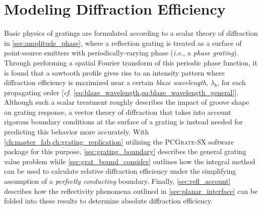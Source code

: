 \section{Modeling Diffraction Efficiency}\label{sec:integral_method}
Basic physics of gratings are formulated according to a scalar theory of diffraction in \cref{sec:amplitude_phase}, where a reflection grating is treated as a surface of point-source emitters with periodically-varying phase (\emph{i.e.}, a \emph{phase grating}). 
Through performing a spatial Fourier transform of this periodic phase function, it is found that a sawtooth profile gives rise to an intensity pattern where diffraction efficiency is maximized near a certain \emph{blaze wavelength}, $\lambda_b$, for each propagating order [\emph{cf.\@} \cref{eq:blaze_wavelength,eq:blaze_wavelength_general}]. 
Although such a scalar treatment roughly describes the impact of groove shape on grating response, a vector theory of diffraction that takes into account rigorous boundary conditions at the surface of a grating is instead needed for predicting this behavior more accurately. 
With \cref{ch:master_fab,ch:grating_replication} utilizing the \textsc{PCGrate-SX} software package \cite{PCGrate_web} for this purpose, \cref{sec:grating_boundary} describes the general grating value problem while \cref{sec:grat_bound_consider} outlines how the integral method can be used to calculate relative diffraction efficiency under the simplifying assumption of a \emph{perfectly conducting} boundary. 
Finally, \cref{sec:refl_account} describes how the reflectivity phenomena outlined in \cref{sec:planar_interface} can be folded into these results to determine absolute diffraction efficiency. 

